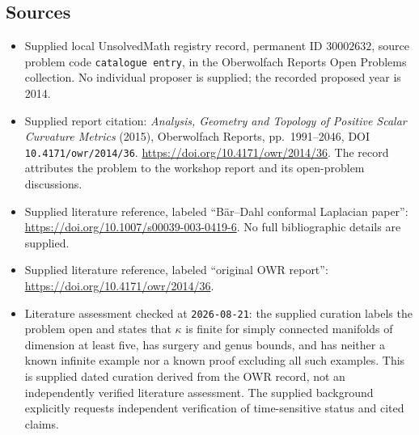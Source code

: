 \documentclass[11pt]{article}
\begin{document}
\subsection{Sources}
\begin{itemize}
\item Supplied local UnsolvedMath registry record, permanent ID \(30002632\), source problem code \texttt{catalogue entry}, in the Oberwolfach Reports Open Problems collection. No individual proposer is supplied; the recorded proposed year is 2014.
\item Supplied report citation: \emph{Analysis, Geometry and Topology of Positive Scalar Curvature Metrics} (2015), Oberwolfach Reports, pp.\ 1991--2046, DOI \texttt{10.4171/owr/2014/36}. \url{https://doi.org/10.4171/owr/2014/36}. The record attributes the problem to the workshop report and its open-problem discussions.
\item Supplied literature reference, labeled ``B\"ar--Dahl conformal Laplacian paper'': \url{https://doi.org/10.1007/s00039-003-0419-6}. No full bibliographic details are supplied.
\item Supplied literature reference, labeled ``original OWR report'': \url{https://doi.org/10.4171/owr/2014/36}.
\item Literature assessment checked at \texttt{2026-08-21}: the supplied curation labels the problem open and states that \(\kappa\) is finite for simply connected manifolds of dimension at least five, has surgery and genus bounds, and has neither a known infinite example nor a known proof excluding all such examples. This is supplied dated curation derived from the OWR record, not an independently verified literature assessment. The supplied background explicitly requests independent verification of time-sensitive status and cited claims.
\end{itemize}
\end{document}
